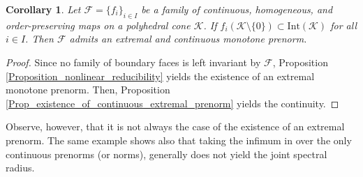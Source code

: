 \documentclass{article}
\newtheorem{corollary}[theorem]{Corollary}
\newcommand{\family}{\mathcal{F}}
\newcommand{\cone}{\mathcal{K}}
\newcommand{\interior}{\mathrm{Int}}
\begin{document}
\begin{corollary}\label{corollary_existence_cont_extr_prenorm}
    Let $\family=\{f_i\}_{i\in I}$ be a family of continuous, homogeneous, and order-preserving maps on a polyhedral cone $\cone$. If $f_i(\cone\setminus\{0\})\subset \interior(\cone)$ for all $i\in I$. Then $\family$ admits an extremal and continuous monotone prenorm.
\end{corollary}
\begin{proof}
    Since no family of boundary faces is left invariant by $\family$, Proposition \ref{Proposition_nonlinear_reducibility} yields the existence of an extremal monotone prenorm. Then, Proposition \ref{Prop_existence_of_continuous_extremal_prenorm} yields the continuity.
\end{proof}
%
Observe, however, that it is not always the case of the existence of an extremal prenorm. The same example shows also that taking the infimum in  over the only continuous prenorms (or norms), generally does not yield the joint spectral radius.
%
\end{document}
